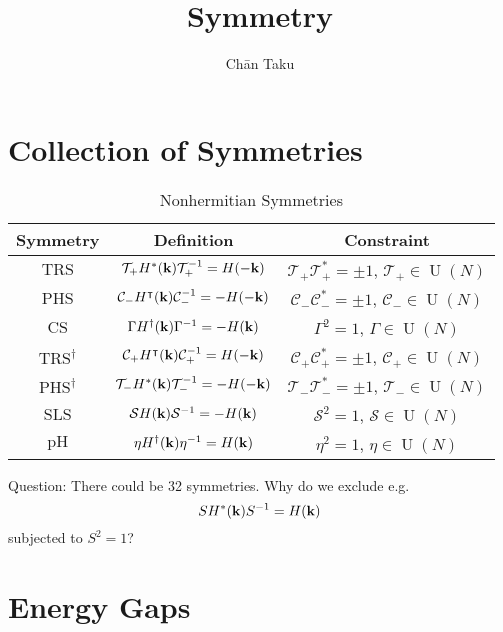 \documentclass{article}
\title{Symmetry}
\author{Ch\=an Taku}
\begin{document}
\maketitle

\section{Collection of Symmetries}

\begin{table}[ht]
    \centering
    \label{table:nonhermitian_symmetries}
    \caption{Nonhermitian Symmetries}
    \begin{tabular}{ccc}
        \toprule
        Symmetry & Definition & Constraint \\
        \midrule
        $\text{TRS}$ & $\mathcal{T}_+ H^*(\vb{k}) \mathcal{T}^{-1}_+ = H(-\vb{k})$ & $\mathcal{T}_+ \mathcal{T}^*_+ = \pm 1$, $\mathcal{T}_+ \in \operatorname{U}(N)$ \\
        $\text{PHS}$ & $\mathcal{C}_- H^\intercal(\vb{k}) \mathcal{C}^{-1}_- = -H(-\vb{k})$ & $\mathcal{C}_- \mathcal{C}^*_- = \pm 1$, $\mathcal{C}_- \in \operatorname{U}(N)$ \\
        $\text{CS}$ & $\Gamma H^\dagger(\vb{k})\Gamma^{-1} = -H(\vb{k})$ & $\Gamma^2 = 1$, $\Gamma\in\operatorname{U}(N)$ \\
        $\text{TRS}^\dagger$ & $\mathcal{C}_+ H^\intercal(\vb{k}) \mathcal{C}^{-1}_+ = H(-\vb{k})$ & $\mathcal{C}_+ \mathcal{C}^*_+ = \pm 1$, $\mathcal{C}_+ \in \operatorname{U}(N)$ \\
        $\text{PHS}^\dagger$ & $\mathcal{T}_- H^*(\vb{k}) \mathcal{T}^{-1}_- = -H(-\vb{k})$ & $\mathcal{T}_- \mathcal{T}^*_- = \pm 1$, $\mathcal{T}_- \in \operatorname{U}(N)$ \\
        $\text{SLS}$ & $\mathcal{S}H(\vb{k})\mathcal{S}^{-1} = -H(\vb{k})$ & $\mathcal{S}^2 = 1$, $\mathcal{S}\in\operatorname{U}(N)$ \\
        $\text{pH}$ & $\eta H^\dagger(\vb{k}) \eta^{-1} = H(\vb{k})$ & $\eta^2 = 1$, $\eta\in\operatorname{U}(N)$ \\
        \bottomrule
    \end{tabular}

\end{table}

{\color{red}Question:
There could be 32 symmetries.
Why do we exclude e.g. \[ S H^*(\vb{k}) S^{-1} = H(\vb{k}) \] subjected to $S^2 = 1$?}

\section{Energy Gaps}
\end{document}
